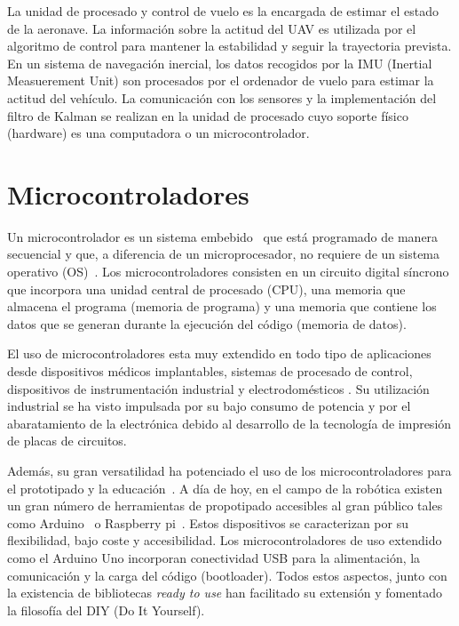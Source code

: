 \documentclass[a4paper,12pt]{book}
\begin{document}
La unidad de procesado y control de vuelo es la encargada de estimar el estado de la aeronave. La información sobre la actitud del UAV es utilizada por el algoritmo de control para mantener la estabilidad y seguir la trayectoria prevista. En un sistema de navegación inercial, los datos recogidos por la IMU (Inertial Measuerement Unit) son procesados por el ordenador de vuelo para estimar la actitud del vehículo. La comunicación con los sensores y la implementación del filtro de Kalman se realizan en la unidad de procesado cuyo soporte físico (hardware) es una computadora o un microcontrolador.



\section{Microcontroladores}

Un microcontrolador es un sistema embebido~\cite{marwedel2021embedded} que está programado de manera secuencial y que, a diferencia de un microprocesador, no requiere de un sistema operativo (OS)~\cite{bolanakis2019survey}. Los microcontroladores consisten en un circuito digital síncrono que incorpora una unidad central de procesado (CPU), una memoria que almacena el programa (memoria de programa) y una memoria que contiene los datos que se generan durante la ejecución del código (memoria de datos). 

El uso de microcontroladores esta muy extendido en todo tipo de aplicaciones desde dispositivos médicos implantables, sistemas de procesado de control, dispositivos de instrumentación industrial y electrodomésticos \cite{kondaveeti2021systematic}. Su utilización industrial se ha visto impulsada por su bajo consumo de potencia y por el abaratamiento de la electrónica debido al desarrollo de la tecnología de impresión de placas de circuitos.

Además, su gran versatilidad ha potenciado el uso de los microcontroladores para el prototipado y la educación~\cite{bolanakis2019survey}. A día de hoy, en el campo de la robótica existen un gran número de herramientas de propotipado accesibles al gran público tales como Arduino~\cite{kondaveeti2021systematic}  o Raspberry pi~\cite{upton2016raspberry}. Estos dispositivos se caracterizan por su flexibilidad, bajo coste y accesibilidad. Los microcontroladores de uso extendido como el Arduino Uno incorporan conectividad USB para la alimentación, la comunicación y la carga del código (bootloader). Todos estos aspectos, junto con la existencia de bibliotecas \emph{ready to use} han facilitado su extensión y fomentado la filosofía del DIY (Do It Yourself).
\end{document}

